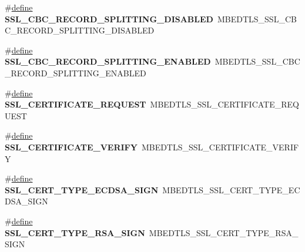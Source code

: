 \begin{DoxyCompactItemize}
\item 
\mbox{\label{compat-1_83_8h_a77a734ddfdb09c3df8566bca957bfef6}} 
\#\hyperlink{structdefine}{define} {\bfseries S\+S\+L\+\_\+\+C\+B\+C\+\_\+\+R\+E\+C\+O\+R\+D\+\_\+\+S\+P\+L\+I\+T\+T\+I\+N\+G\+\_\+\+D\+I\+S\+A\+B\+L\+ED}~M\+B\+E\+D\+T\+L\+S\+\_\+\+S\+S\+L\+\_\+\+C\+B\+C\+\_\+\+R\+E\+C\+O\+R\+D\+\_\+\+S\+P\+L\+I\+T\+T\+I\+N\+G\+\_\+\+D\+I\+S\+A\+B\+L\+ED
\item 
\mbox{\label{compat-1_83_8h_abe2e17d73716b55f0436437692933ede}} 
\#\hyperlink{structdefine}{define} {\bfseries S\+S\+L\+\_\+\+C\+B\+C\+\_\+\+R\+E\+C\+O\+R\+D\+\_\+\+S\+P\+L\+I\+T\+T\+I\+N\+G\+\_\+\+E\+N\+A\+B\+L\+ED}~M\+B\+E\+D\+T\+L\+S\+\_\+\+S\+S\+L\+\_\+\+C\+B\+C\+\_\+\+R\+E\+C\+O\+R\+D\+\_\+\+S\+P\+L\+I\+T\+T\+I\+N\+G\+\_\+\+E\+N\+A\+B\+L\+ED
\item 
\mbox{\label{compat-1_83_8h_aabdd2458ee6fc9f98f9b65a4720e0470}} 
\#\hyperlink{structdefine}{define} {\bfseries S\+S\+L\+\_\+\+C\+E\+R\+T\+I\+F\+I\+C\+A\+T\+E\+\_\+\+R\+E\+Q\+U\+E\+ST}~M\+B\+E\+D\+T\+L\+S\+\_\+\+S\+S\+L\+\_\+\+C\+E\+R\+T\+I\+F\+I\+C\+A\+T\+E\+\_\+\+R\+E\+Q\+U\+E\+ST
\item 
\mbox{\label{compat-1_83_8h_aff8f6f24abf55604a02839d7a1f2da99}} 
\#\hyperlink{structdefine}{define} {\bfseries S\+S\+L\+\_\+\+C\+E\+R\+T\+I\+F\+I\+C\+A\+T\+E\+\_\+\+V\+E\+R\+I\+FY}~M\+B\+E\+D\+T\+L\+S\+\_\+\+S\+S\+L\+\_\+\+C\+E\+R\+T\+I\+F\+I\+C\+A\+T\+E\+\_\+\+V\+E\+R\+I\+FY
\item 
\mbox{\label{compat-1_83_8h_ab82db2f8b69801caaff542cbb575f109}} 
\#\hyperlink{structdefine}{define} {\bfseries S\+S\+L\+\_\+\+C\+E\+R\+T\+\_\+\+T\+Y\+P\+E\+\_\+\+E\+C\+D\+S\+A\+\_\+\+S\+I\+GN}~M\+B\+E\+D\+T\+L\+S\+\_\+\+S\+S\+L\+\_\+\+C\+E\+R\+T\+\_\+\+T\+Y\+P\+E\+\_\+\+E\+C\+D\+S\+A\+\_\+\+S\+I\+GN
\item 
\mbox{\label{compat-1_83_8h_a6251d055d62aa78961d06540a64a87e0}} 
\#\hyperlink{structdefine}{define} {\bfseries S\+S\+L\+\_\+\+C\+E\+R\+T\+\_\+\+T\+Y\+P\+E\+\_\+\+R\+S\+A\+\_\+\+S\+I\+GN}~M\+B\+E\+D\+T\+L\+S\+\_\+\+S\+S\+L\+\_\+\+C\+E\+R\+T\+\_\+\+T\+Y\+P\+E\+\_\+\+R\+S\+A\+\_\+\+S\+I\+GN
\item 
\mbox{\label{compat-1_83_8h_a04a1d820c9add2558a6547fb6c78c32a}} 

\end{DoxyCompactItemize}
